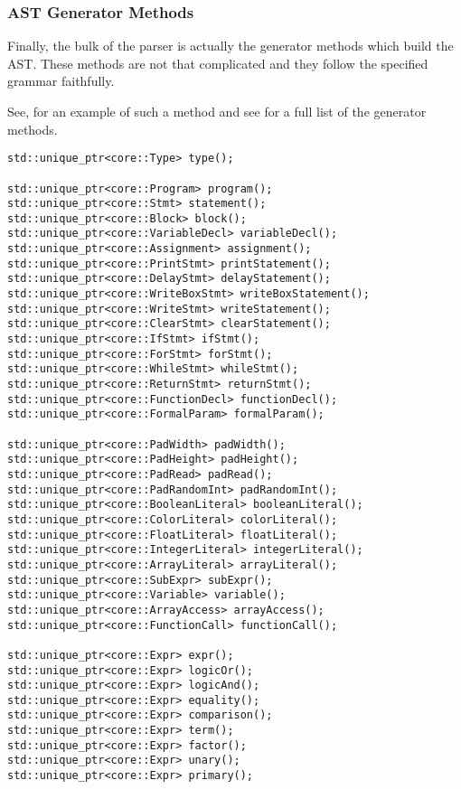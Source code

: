 \subsubsection{AST Generator Methods}

Finally, the bulk of the parser is actually the generator
methods which build the AST. These methods are not that
complicated and they follow the specified grammar faithfully.

See,  for an example of such a method and see
 for a full list of the generator methods.



\begin{lstlisting}[caption={The main body of methods in the
\texttt{Parser} class (parser/Parser.hpp).},
label=lst:methodslist]
std::unique_ptr<core::Type> type();

std::unique_ptr<core::Program> program();
std::unique_ptr<core::Stmt> statement();
std::unique_ptr<core::Block> block();
std::unique_ptr<core::VariableDecl> variableDecl();
std::unique_ptr<core::Assignment> assignment();
std::unique_ptr<core::PrintStmt> printStatement();
std::unique_ptr<core::DelayStmt> delayStatement();
std::unique_ptr<core::WriteBoxStmt> writeBoxStatement();
std::unique_ptr<core::WriteStmt> writeStatement();
std::unique_ptr<core::ClearStmt> clearStatement();
std::unique_ptr<core::IfStmt> ifStmt();
std::unique_ptr<core::ForStmt> forStmt();
std::unique_ptr<core::WhileStmt> whileStmt();
std::unique_ptr<core::ReturnStmt> returnStmt();
std::unique_ptr<core::FunctionDecl> functionDecl();
std::unique_ptr<core::FormalParam> formalParam();

std::unique_ptr<core::PadWidth> padWidth();
std::unique_ptr<core::PadHeight> padHeight();
std::unique_ptr<core::PadRead> padRead();
std::unique_ptr<core::PadRandomInt> padRandomInt();
std::unique_ptr<core::BooleanLiteral> booleanLiteral();
std::unique_ptr<core::ColorLiteral> colorLiteral();
std::unique_ptr<core::FloatLiteral> floatLiteral();
std::unique_ptr<core::IntegerLiteral> integerLiteral();
std::unique_ptr<core::ArrayLiteral> arrayLiteral();
std::unique_ptr<core::SubExpr> subExpr();
std::unique_ptr<core::Variable> variable();
std::unique_ptr<core::ArrayAccess> arrayAccess();
std::unique_ptr<core::FunctionCall> functionCall();

std::unique_ptr<core::Expr> expr();
std::unique_ptr<core::Expr> logicOr();
std::unique_ptr<core::Expr> logicAnd();
std::unique_ptr<core::Expr> equality();
std::unique_ptr<core::Expr> comparison();
std::unique_ptr<core::Expr> term();
std::unique_ptr<core::Expr> factor();
std::unique_ptr<core::Expr> unary();
std::unique_ptr<core::Expr> primary();
\end{lstlisting}

